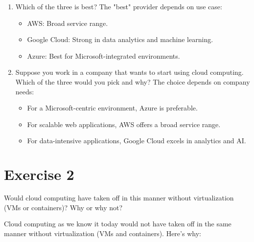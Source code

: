\documentclass{article}
\newcommand{\exercise}[1]{
    \section*{Exercise #1}
    \markboth{Exercise #1}{}
}
\begin{document}
\begin{enumerate}
  \item Which of the three is best?\newline
  The "best" provider depends on use case:
  \begin{itemize}
    \item AWS: Broad service range.
    \item Google Cloud: Strong in data analytics and machine learning.
    \item Azure: Best for Microsoft-integrated environments.
  \end{itemize}
  
  \item Suppose you work in a company that wants to start
  using cloud computing. Which of the three would you pick
  and why?
  The choice depends on company needs:
  \begin{itemize}
    \item For a Microsoft-centric environment, Azure
    is preferable.
    \item For scalable web applications, AWS offers
    a broad service range.
    \item For data-intensive applications, Google Cloud
    excels in analytics and AI.
  \end{itemize}

\end{enumerate}




\newpage

\exercise{2}
Would cloud computing have taken off in this
manner without virtualization (VMs or containers)?
Why or why not?
  
  Cloud computing as we know it today would not
  have taken off in the same manner without virtualization
  (VMs and containers). Here’s why:
\end{document}
